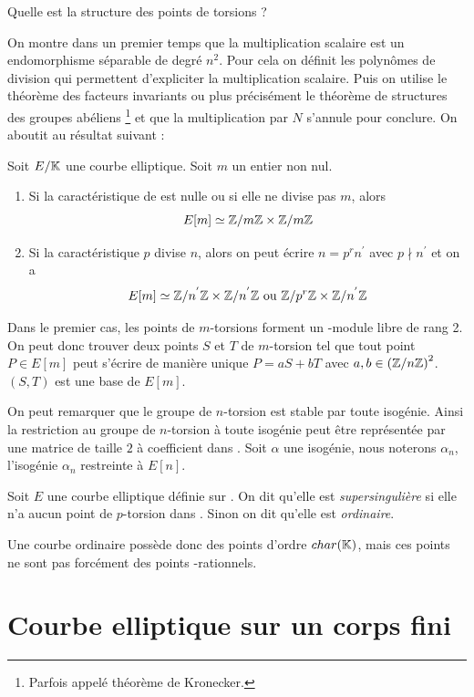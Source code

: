 \noindent Quelle est la structure des points de torsions ? 

On montre dans un premier temps que la multiplication scalaire est un endomorphisme séparable de degré $n^2$. Pour cela on définit les polynômes de division qui permettent d'expliciter la multiplication scalaire. Puis on utilise le théorème des facteurs invariants ou plus précisément le théorème de structures des groupes abéliens \footnote{Parfois appelé théorème de Kronecker.} et que la multiplication par $N$ s'annule pour conclure. On aboutit au résultat suivant :
\begin{propriete}
Soit $E/\mathbb{K}{}$ une courbe elliptique. Soit $m$ un entier non nul. 
\begin{enumerate}
    \item Si la caractéristique de \field{} est nulle ou si elle ne divise pas $m$, alors 
    $$E[m] \simeq \mathbb{Z}/m\mathbb{Z} \times \mathbb{Z}/m\mathbb{Z}$$
    \item Si la caractéristique $p$ divise $n$, alors on peut écrire $n = p^r n^{'}$ avec $p\nmid n^{'}$ et on a 
    $$E[m] \simeq \mathbb{Z}/n^{'}\mathbb{Z} \times \mathbb{Z}/n^{'}\mathbb{Z} \text{ ou } \mathbb{Z}/p^{r}\mathbb{Z} \times \mathbb{Z}/n^{'}\mathbb{Z}$$
\end{enumerate}
\end{propriete}

Dans le premier cas, les points de $m$-torsions forment un -module libre de rang 2. On peut donc trouver deux points $S$ et $T$ de $m$-torsion tel que tout point $P \in E[m]$ peut s'écrire de manière unique $P = aS + bT$ avec $a, b \in \left ( \mathbb{Z}/n\mathbb{Z} \right )^2$. $(S, T)$ est une base de $E[m]$.

On peut remarquer que le groupe de $n$-torsion est stable par toute isogénie. Ainsi la restriction au groupe de $n$-torsion à toute isogénie peut être représentée par une matrice de taille $2$ à coefficient dans \Zn{}. Soit $\alpha$ une isogénie, nous noterons $\alpha_n$, l'isogénie $\alpha_n$ restreinte à $E[n]$.

\begin{definition}\label{supersingular}
Soit $E$ une courbe elliptique définie sur . On dit qu'elle est \emph{supersingulière} si elle n'a aucun point de $p$-torsion dans \closure[\GF{q}]. Sinon on dit qu'elle est \emph{ordinaire}.
\end{definition}
Une courbe ordinaire possède donc des points d'ordre $char(\mathbb{K}{})$, mais ces points ne sont pas forcément des points \field{}-rationnels.


\section{Courbe elliptique sur un corps fini}
